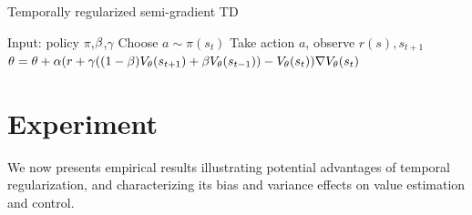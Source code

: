 \begin{algorithm}[H]
\caption{Temporally regularized semi-gradient TD}
\begin{algorithmic}[1]
	\label{reg_td}
    \STATE Input: policy $\pi$,$\beta$,$\gamma$
        \STATE Choose $a \sim \pi(s_t)$
        \STATE Take action $a$, observe $r(s),s_{t+1}$
        \STATE $\theta = \theta + \alpha (r + \gamma((1-\beta) V_{\theta}(s_{t+1}) + \beta V_{\theta}(s_{t-1})) - V_{\theta}(s_t))\nabla V_{\theta}(s_{t}) $
    \ENDFOR
\end{algorithmic}
\end{algorithm}


\section{Experiment}
We now presents empirical results illustrating potential advantages of temporal regularization, and characterizing its bias and variance effects on value estimation and control.



